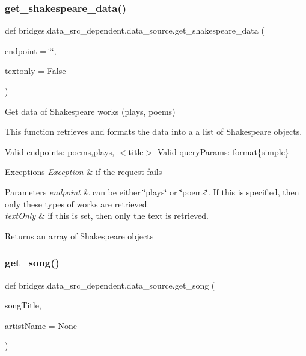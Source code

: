 \subsubsection{\texorpdfstring{get\+\_\+shakespeare\+\_\+data()}{get\_shakespeare\_data()}}
{\footnotesize\ttfamily def bridges.\+data\+\_\+src\+\_\+dependent.\+data\+\_\+source.\+get\+\_\+shakespeare\+\_\+data (\begin{DoxyParamCaption}\item[{}]{endpoint = {\ttfamily \char`\"{}\char`\"{}},  }\item[{}]{textonly = {\ttfamily False} }\end{DoxyParamCaption})}



Get data of Shakespeare works (plays, poems) 

This function retrieves and formats the data into a a list of Shakespeare objects.

Valid endpoints\+: \textquotesingle{}poems\textquotesingle{},\textquotesingle{}plays\textquotesingle{}, $<$title$>$ Valid query\+Params\+: format\{simple\}


\begin{DoxyExceptions}{Exceptions}
{\em Exception} & if the request fails\\
\hline
\end{DoxyExceptions}

\begin{DoxyParams}{Parameters}
{\em endpoint} & can be either \char`\"{}plays\char`\"{} or \char`\"{}poems\char`\"{}. If this is specified, then only these types of works are retrieved. \\
\hline
{\em text\+Only} & if this is set, then only the text is retrieved.\\
\hline
\end{DoxyParams}
\begin{DoxyReturn}{Returns}
an array of Shakespeare objects 
\end{DoxyReturn}
\mbox{\label{namespacebridges_1_1data__src__dependent_1_1data__source_a060ab8ec1777a5458a37d5e01e594e82}} 
\subsubsection{\texorpdfstring{get\+\_\+song()}{get\_song()}}
{\footnotesize\ttfamily def bridges.\+data\+\_\+src\+\_\+dependent.\+data\+\_\+source.\+get\+\_\+song (\begin{DoxyParamCaption}\item[{}]{song\+Title,  }\item[{}]{artist\+Name = {\ttfamily None} }\end{DoxyParamCaption})}



